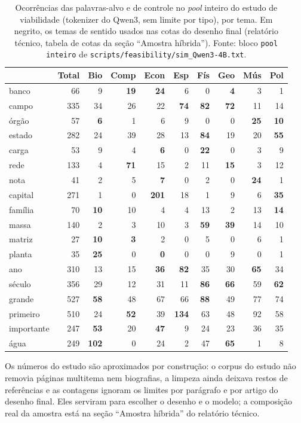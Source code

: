 \documentclass[11pt,a4paper]{article}
\newcommand{\cod}[1]{\texttt{#1}}              %
\begin{document}
\begin{table}[htbp]
\centering
\caption{Ocorrências das palavras-alvo e de controle no \emph{pool} inteiro do estudo de
viabilidade (tokenizer do Qwen3, sem limite por tipo), por tema. Em negrito, os temas de
sentido usados nas cotas do desenho final (relatório técnico, tabela de cotas da seção ``Amostra híbrida''). Fonte: bloco \cod{pool
inteiro} de \cod{scripts/feasibility/sim\_Qwen3-4B.txt}.}\label{tab:viab-pool}
\footnotesize
\setlength{\tabcolsep}{4.5pt}
\begin{tabular}{@{}l r r r r r r r r r@{}}
\toprule
& \textbf{Total} & \textbf{Bio} & \textbf{Comp} & \textbf{Econ} & \textbf{Esp} & \textbf{Fís}
& \textbf{Geo} & \textbf{Mús} & \textbf{Pol} \\
\midrule
banco & 66 & 9 & \textbf{19} & \textbf{24} & 6 & 0 & \textbf{4} & 3 & 1 \\
campo & 335 & 34 & 26 & 22 & \textbf{74} & \textbf{82} & \textbf{72} & 11 & 14 \\
órgão & 57 & \textbf{6} & 1 & 6 & 9 & 0 & 0 & \textbf{25} & \textbf{10} \\
estado & 282 & 24 & 39 & 28 & 13 & \textbf{84} & 19 & 20 & \textbf{55} \\
carga & 53 & 9 & 4 & \textbf{6} & 0 & \textbf{22} & 0 & 3 & 9 \\
rede & 133 & 4 & \textbf{71} & 15 & 2 & 11 & \textbf{15} & 3 & 12 \\
nota & 41 & 2 & 5 & \textbf{7} & 0 & 2 & 0 & \textbf{24} & 1 \\
capital & 271 & 1 & 0 & \textbf{201} & 18 & 1 & 9 & 6 & \textbf{35} \\
família & 70 & \textbf{10} & 10 & 4 & 4 & 13 & 2 & 13 & \textbf{14} \\
massa & 140 & 2 & 3 & 10 & 3 & \textbf{59} & \textbf{39} & 14 & 10 \\
matriz & 27 & \textbf{10} & \textbf{3} & 2 & 0 & 5 & 0 & 6 & 1 \\
planta & 35 & \textbf{25} & 0 & \textbf{0} & 0 & 0 & 9 & 0 & 1 \\
\midrule
ano & 310 & 13 & 15 & \textbf{36} & \textbf{82} & 35 & 30 & \textbf{65} & 34 \\
século & 356 & 29 & 12 & 31 & 11 & \textbf{86} & \textbf{66} & 59 & \textbf{62} \\
grande & 527 & \textbf{58} & 48 & 67 & 66 & \textbf{88} & 49 & 77 & 74 \\
primeiro & 510 & 24 & \textbf{52} & 39 & \textbf{134} & 63 & 48 & 92 & 58 \\
importante & 247 & \textbf{53} & 20 & \textbf{47} & 9 & 24 & 23 & 36 & 35 \\
água & 249 & \textbf{102} & 0 & 24 & 2 & 47 & \textbf{65} & 1 & 8 \\
\bottomrule
\end{tabular}
\end{table}

Os números do estudo são aproximados por construção: o corpus do estudo não removia páginas
multitema nem biografias, a limpeza ainda deixava restos de referências e as contagens
ignoram os limites por parágrafo e por artigo do desenho final. Eles serviram para escolher o
desenho e o modelo; a composição real da amostra está na seção ``Amostra híbrida'' do relatório técnico.
\end{document}
